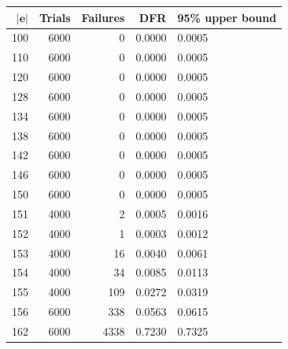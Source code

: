 \begin{tabular}{rrrrl}
\toprule
$|\mathbf e|$ & Trials & Failures & DFR & 95\% upper bound\\
\midrule
100 & 6000 & 0 & 0.0000 & 0.0005\\
110 & 6000 & 0 & 0.0000 & 0.0005\\
120 & 6000 & 0 & 0.0000 & 0.0005\\
128 & 6000 & 0 & 0.0000 & 0.0005\\
134 & 6000 & 0 & 0.0000 & 0.0005\\
138 & 6000 & 0 & 0.0000 & 0.0005\\
142 & 6000 & 0 & 0.0000 & 0.0005\\
146 & 6000 & 0 & 0.0000 & 0.0005\\
150 & 6000 & 0 & 0.0000 & 0.0005\\
151 & 4000 & 2 & 0.0005 & 0.0016\\
152 & 4000 & 1 & 0.0003 & 0.0012\\
153 & 4000 & 16 & 0.0040 & 0.0061\\
154 & 4000 & 34 & 0.0085 & 0.0113\\
155 & 4000 & 109 & 0.0272 & 0.0319\\
156 & 6000 & 338 & 0.0563 & 0.0615\\
162 & 6000 & 4338 & 0.7230 & 0.7325\\
\bottomrule
\end{tabular}
